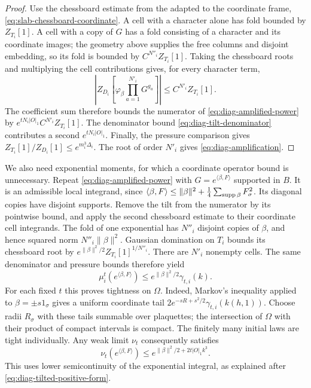 \begin{proof}
Use the chessboard estimate from the adapted to the coordinate
frame, \eqref{eq:slab-chessboard-coordinate}. A cell with a
character alone has fold bounded by $Z_{T_i}[1]$. A cell with
a copy of $G$ has a fold consisting of a character and its
coordinate images; the geometry above supplies the free columns
and disjoint embedding, so its fold is bounded by
$C^{N''_i}Z_{T_i}[1]$. Taking the chessboard roots and multiplying
the cell contributions gives, for every character term,
\[
 \left|Z_{D_i}\left[\varphi_\beta
                    \prod_{a=1}^{N'_i}G^{g_a}\right]\right|
                \le C^{N'_i}Z_{T_i}[1].
\]
The coefficient sum therefore bounds the numerator of
\eqref{eq:diag-amplified-power} by
$e^{tN_i|O|_1}C^{N'_i}Z_{T_i}[1]$. The denominator bound
\eqref{eq:diag-tilt-denominator} contributes a second
$e^{tN_i|O|_1}$. Finally, the pressure comparison gives
$Z_{T_i}[1]/Z_{D_i}[1]\le e^{m_i^3\Delta_i}$.
The root of order $N'_i$ gives
\eqref{eq:diag-amplification}.
\end{proof}

We also need exponential moments, for which a coordinate operator
bound is unnecessary. Repeat \eqref{eq:diag-amplified-power} with
$G=e^{\langle\beta,F\rangle}$ supported in $B$. It is an admissible
local integrand, since
$\langle\beta,F\rangle\le\|\beta\|^2+
\frac14\sum_{\operatorname{supp}\beta}F_\sigma^2$. Its diagonal copies have
disjoint supports. Remove the tilt from the numerator by its
pointwise bound, and apply the second chessboard estimate to
their coordinate cell integrands. The fold of one exponential
has $N''_i$ disjoint copies of $\beta$, and hence squared norm
$N''_i\|\beta\|^2$. Gaussian domination on $T_i$ bounds its
chessboard root by
$e^{\|\beta\|^2/2}Z_{T_i}[1]^{1/N''_i}$. There are $N'_i$
nonempty cells. The same denominator and pressure bounds
therefore yield
\begin{equation}\label{eq:diag-tilted-domination}
 \mu_i^t(e^{\langle\beta,F\rangle})
      \le e^{\|\beta\|^2/2}\gamma_{t,i}(k).
\end{equation}
For each fixed $t$ this proves tightness on $\Omega$. Indeed,
Markov's inequality applied to $\beta=\pm s1_\sigma$ gives a
uniform coordinate tail $2e^{-sR+s^2/2}\gamma_{t,i}(k(h,1))$.
Choose radii $R_\sigma$ with these tails summable over plaquettes;
the intersection of $\Omega$ with their product of compact
intervals is compact. The finitely many initial laws are tight
individually. Any weak limit $\nu_t$ consequently satisfies
\begin{equation}\label{eq:diag-limit-domination}
 \nu_t(e^{\langle\beta,F\rangle})
      \le e^{\|\beta\|^2/2+2t|O|_1k^3}.
\end{equation}
This uses lower semicontinuity of the exponential integral,
as explained after \eqref{eq:diag-tilted-positive-form}.

